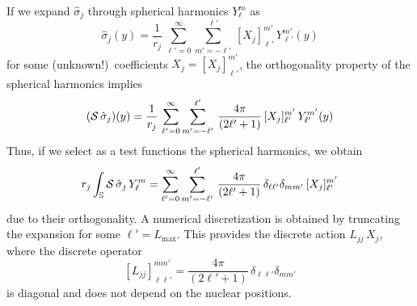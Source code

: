 If we expand $\hat{\sigma}_j$ through spherical harmonics $Y_\ell^m$ as
\[
\hat{\sigma}_j(y) = \frac{1}{r_j} \, \sum_{\ell'= 0}^{\infty} \sum_{m' = -\ell'}^{\ell'} \,  [X_j]_{\ell'}^{m'} \, Y_{\ell'}^{m'}(y)
\]
for some (unknown!)~coefficients $X_j = [X_j]_{\ell'}^{m'}$, the orthogonality property of the spherical harmonics implies
\[
(\mathcal{S} \, \hat{\sigma}_j)(y) = \frac{1}{r_j} \, \sum_{\ell'= 0}^{\infty} \sum_{m' = -\ell'}^{\ell'} \, \frac{4\pi}{(2\ell' + 1)}\, [X_j]_{\ell'}^{m'} \, Y_{\ell'}^{m'}(y)
\]
Thus, if we select as a test functions the spherical harmonics, we obtain
\begin{equation*}%
r_j\int_\mathbb{S} \cS \, \hat{\sigma}_j \, Y_\ell^m = \sum_{\ell'= 0}^{\infty} \sum_{m' = -\ell'}^{\ell'} \, \frac{4\pi}{(2\ell' + 1)} \, \delta_{\ell \ell'} \delta_{m m'}\, [X_j]_{\ell'}^{m'} 
\end{equation*}
due to their orthogonality. A numerical discretization is obtained by truncating the expansion for some $\ell'=L_\text{max}$. This provides the discrete action $L_{jj} \, X_j$, where the discrete operator
\begin{equation}\label{eq:61}
 [L_{jj}]_{\ell \ell'}^{m m'} =  \frac{4\pi}{(2\ell' + 1)} \, \delta_{\ell \ell'} \delta_{m m'}
\end{equation}
is diagonal and does not depend on the nuclear positions.

